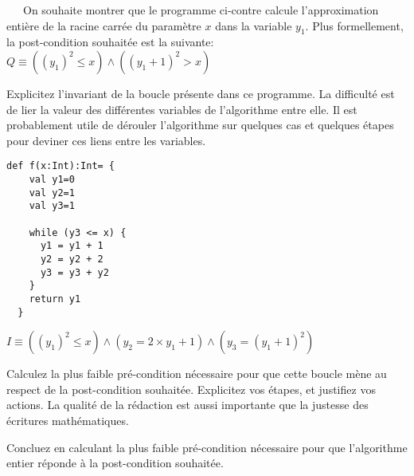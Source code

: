 \documentclass[10pt]{article}\usepackage[correction,nu]{esial}
\begin{document}
\noindent\begin{minipage}{.78\linewidth}
  ~~~On souhaite montrer que le programme ci-contre calcule l'approximation
  entière de la racine carrée du paramètre $x$ dans la variable $y_1$. Plus
  formellement, la post-condition souhaitée est la suivante:
  $Q\equiv\left(\left(y_1\right)^2\leq x\right) \wedge
  \left(\left(y_1+1\right)^2 > x\right)$

  \Question Explicitez l'invariant de la boucle présente dans ce programme. La
  difficulté est de lier la valeur des différentes variables de l'algorithme
  entre elle. Il est probablement utile de dérouler l'algorithme sur quelques
  cas et quelques étapes pour deviner ces liens entre les variables.
\end{minipage}\hfill%
\begin{minipage}{.19\linewidth}
\begin{Verbatim}[gobble=2]
  def f(x:Int):Int= {
    val y1=0
    val y2=1
    val y3=1
    
    while (y3 <= x) {
      y1 = y1 + 1
      y2 = y2 + 2
      y3 = y3 + y2
    }
    return y1
  }
\end{Verbatim}  
\end{minipage}

\begin{Reponse}
  $I\equiv \left(\left(y_1\right)^2\leq x\right) \wedge
           \left(y_2=2\times y_1 + 1\right) \wedge 
           \left(y_3=\left(y_1+1\right)^2\right)$
\end{Reponse}

\Question Calculez la plus faible pré-condition nécessaire pour que cette boucle
mène au respect de la post-condition souhaitée. Explicitez vos étapes, et
justifiez vos actions. La qualité de la rédaction est aussi importante que la
justesse des écritures mathématiques.

\Question Concluez en calculant la plus faible pré-condition nécessaire pour que
l'algorithme entier réponde à la post-condition souhaitée.
\end{document}
